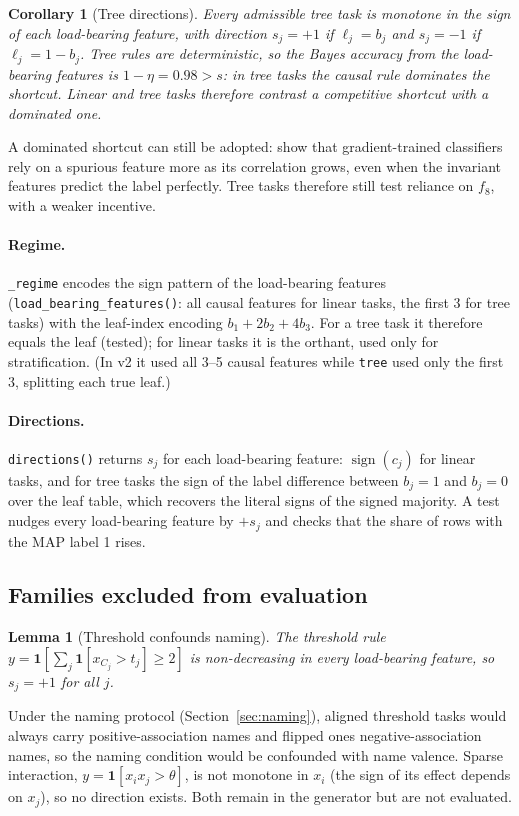 \documentclass[11pt,a4paper]{article}
\newcommand{\1}{\mathbf{1}}
\DeclareMathOperator{\sign}{sign}
\theoremstyle{plain}
\newtheorem{lemma}[theorem]{Lemma}
\newtheorem{corollary}[theorem]{Corollary}
\theoremstyle{definition}
\theoremstyle{remark}
\begin{document}
\begin{corollary}[Tree directions]
Every admissible tree task is monotone in the sign of each load-bearing
feature, with direction $s_j = +1$ if $\ell_j = b_j$ and $s_j = -1$ if
$\ell_j = 1 - b_j$. Tree rules are deterministic, so the Bayes accuracy from
the load-bearing features is $1 - \eta = 0.98 > s$: in tree tasks the causal
rule dominates the shortcut. Linear and tree tasks therefore contrast a
competitive shortcut with a dominated one.
\end{corollary}
A dominated shortcut can still be adopted:
\citet{nagarajan2021understanding} show that gradient-trained classifiers
rely on a spurious feature more as its correlation grows, even when the
invariant features predict the label perfectly. Tree tasks therefore still
test reliance on $f_8$, with a weaker incentive.

\paragraph{Regime.} \texttt{\_regime} encodes the sign pattern of the
load-bearing features (\texttt{load\_bearing\_features()}: all causal
features for linear tasks, the first 3 for tree tasks) with the leaf-index
encoding $b_1 + 2b_2 + 4b_3$. For a tree task it therefore equals the leaf
(tested); for linear tasks it is the orthant, used only for stratification.
(In v2 it used all 3--5 causal features while \texttt{tree} used only the
first 3, splitting each true leaf.)

\paragraph{Directions.} \texttt{directions()} returns $s_j$ for each
load-bearing feature: $\sign(c_j)$ for linear tasks, and for tree tasks the
sign of the label difference between $b_j = 1$ and $b_j = 0$ over the leaf
table, which recovers the literal signs of the signed majority. A test nudges
every load-bearing feature by $+s_j$ and checks that the share of rows with
the MAP label 1 rises.

\subsection{Families excluded from evaluation}

\begin{lemma}[Threshold confounds naming]
The threshold rule $y = \1[\sum_{j} \1[x_{C_j} > t_j] \geq 2]$ is
non-decreasing in every load-bearing feature, so $s_j = +1$ for all $j$.
\end{lemma}
Under the naming protocol (Section~\ref{sec:naming}), aligned threshold
tasks would always carry positive-association names and flipped ones
negative-association names, so the naming condition would be confounded with
name valence. Sparse interaction, $y = \1[x_i x_j > \theta]$, is not monotone
in $x_i$ (the sign of its effect depends on $x_j$), so no direction exists.
Both remain in the generator but are not evaluated.
\end{document}
